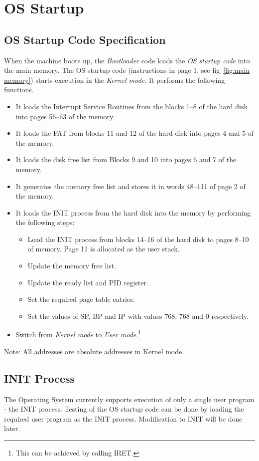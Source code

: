 \chapter{OS Startup}
\label{chp:osstartup}

\section{OS Startup Code Specification}
\label{lbl:oscode}
When the machine boots up, the \textit{Bootloader} code loads the \textit{OS startup code} into the main memory. The OS startup code (instructions in page 1, see fig~\ref{fig:main memory}) starts execution in the \textit{Kernel mode}. It performs the following functions.
\begin{itemize}
	\item It loads the Interrupt Service Routines from the blocks 1--8 of the hard disk into pages 56--63 of the memory.
	\item It loads the FAT from blocks 11 and 12 of the hard disk into pages 4 and 5 of the memory.
	\item It loads the disk free list from Blocks 9 and 10 into pages 6 and 7 of the memory.
	\item It generates the memory free list and stores it in words 48--111 of page 2 of the memory.
	\item It loads the INIT process from the hard disk into the memory by performing the following steps:
	\begin{itemize}
		\item Load the INIT process from blocks 14--16 of the hard disk to pages 8--10 of memory. Page 11 is allocated as the user stack.
		\item Update the memory free list.
		\item Update the ready list and PID register.
		\item Set the required page table entries.
		\item Set the values of SP, BP and IP with values 768, 768 and 0 respectively.
	\end{itemize}
	\item Switch from \textit{Kernel mode} to \textit{User mode}.\footnote{This can be achieved by calling IRET.}
\end{itemize}

Note: All addresses are absolute addresses in Kernel mode. 
\section{INIT Process}
\label{lbl:INITprocess}
The Operating System currently supports execution of only a single user program - the INIT process. Testing of the OS startup code can be done by loading the required user program as the INIT process. Modification to INIT will be done later.
